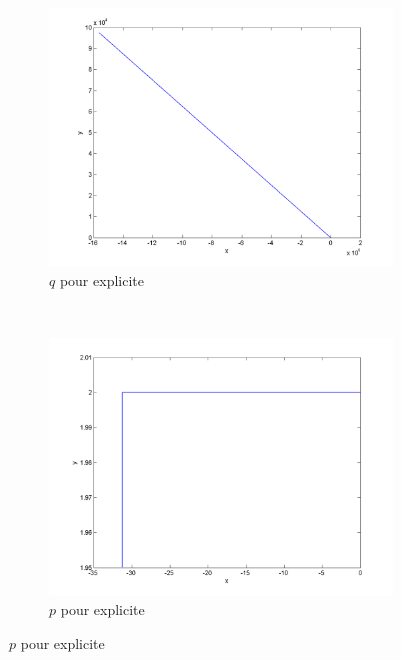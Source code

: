 \begin{figure}
  \centering
  \begin{subfigure}[b]{0.3\textwidth}
    \includegraphics[width=\textwidth]{images/Q1_explicite_rate_q.png}
    \caption{$q$ pour explicite}
    \label{fig:q1_explicite_q}
  \end{subfigure}%
  ~ %
  \begin{subfigure}[b]{0.3\textwidth}
    \includegraphics[width=\textwidth]{images/Q1_explicite_rate_p.png}
    \caption{$p$ pour explicite}
    \label{fig:q1_explicite_p}
  \end{subfigure}

\end{figure}
